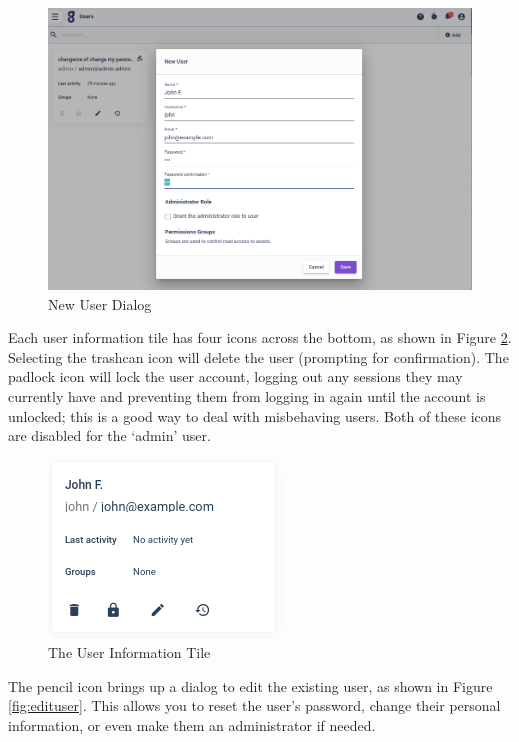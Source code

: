 \begin{figure}
	\includegraphics{images/newuser.png}
	\caption{New User Dialog}
	\label{fig:newuser}
\end{figure}


Each user information tile has four icons across the bottom, as shown in Figure \ref{fig:usertile}.
Selecting the trashcan icon will delete the user (prompting for
confirmation). The padlock icon will lock the user account, logging out
any sessions they may currently have and preventing them from logging in
again until the account is unlocked; this is a good way to deal with
misbehaving users. Both of these icons are disabled for the `admin'
user.

\begin{figure}
	\includegraphics[width=0.5\linewidth]{images/usertile.png}
	\caption{The User Information Tile}
	\label{fig:usertile}
\end{figure}

The pencil icon brings up a dialog to edit the existing user, as shown in Figure \ref{fig:edituser}.
This allows you to reset the user's password, change their personal
information, or even make them an administrator if needed.

